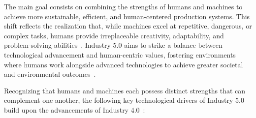 The main goal consists on combining the strengths of humans and machines to achieve more sustainable, efficient, and human-centered production systems. This shift reflects the realization that, while machines excel at repetitive, dangerous, or complex tasks, humans provide irreplaceable creativity, adaptability, and problem-solving abilities~\cite{Maddikunta2022}. Industry 5.0 aims to strike a balance between technological advancement and human-centric values, fostering environments where humans work alongside advanced technologies to achieve greater societal and environmental outcomes~\cite{GOLOVIANKO2023102}.


Recognizing that humans and machines each possess distinct strengths that can complement one another, the following key technological drivers of Industry 5.0 build upon the advancements of Industry 4.0~\cite{Maddikunta2022}:
